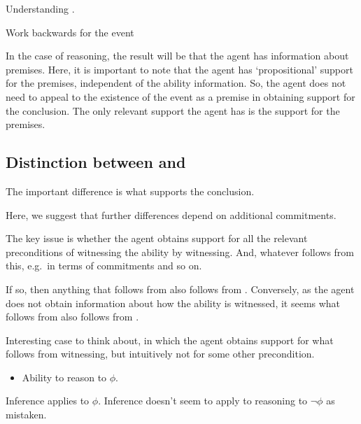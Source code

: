 \begin{note}[Overview]
  Understanding \WR{}.
\end{note}

\begin{note}
  Work backwards for the event
\end{note}

\begin{note}
  In the case of reasoning, the result will be that the agent has information about premises.
  Here, it is important to note that the agent has `propositional' support for the premises, independent of the ability information.
  So, the agent does not need to appeal to the existence of the event as a premise in obtaining support for the conclusion.
  The only relevant support the agent has is the support for the premises.
\end{note}




\subsection{Distinction between \AR{} and \WR{}}
\label{sec:dist-betw-ar}

\begin{note}[Overview]
  The important difference is what supports the conclusion.

  Here, we suggest that further differences depend on additional commitments.
\end{note}


\begin{note}
  The key issue is whether the agent obtains support for all the relevant preconditions of witnessing the ability by witnessing.
  And, whatever follows from this, e.g.\ in terms of commitments and so on.

  If so, then anything that follows from \AR{} also follows from \WR{}.
  Conversely, as the agent does not obtain information about how the ability is witnessed, it seems what follows from \WR{} also follows from \AR{}.
\end{note}

\begin{note}
  Interesting case to think about, in which the agent obtains support for what follows from witnessing, but intuitively not for some other precondition.
  \begin{itemize}
  \item Ability to reason to \(\phi\).
  \end{itemize}
  Inference applies to \(\phi\).
  Inference doesn't seem to apply to reasoning to \(\lnot\phi\) as mistaken.
\end{note}

